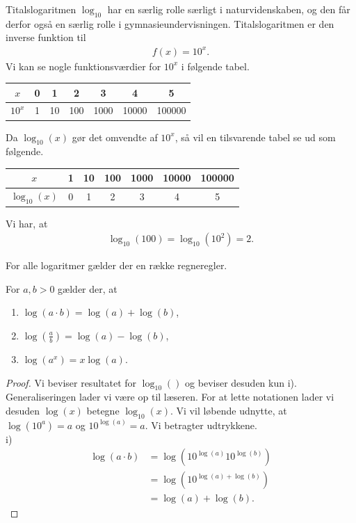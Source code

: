 Titalslogaritmen $\log_{10}$ har en særlig rolle særligt i naturvidenskaben, og den får derfor også en særlig rolle i gymnasieundervisningen. Titalslogaritmen er den inverse funktion til 
\begin{align*}
	f(x) = 10^x.
\end{align*}
Vi kan se nogle funktionsværdier for $10^x$ i følgende tabel.
\begin{table}[H]
	\centering
	\begin{tabular}{c|c|c|c|c|c|c}
		$x$ & 0 & 1 & 2 & 3 & 4 & 5\\
		\hline
		$10^x$ & 1 & 10 & 100 & 1000 & 10000 & 100000
	\end{tabular}
\end{table}
Da $\log_{10}(x)$ gør det omvendte af $10^x$, så vil en tilsvarende tabel se ud som følgende.
\begin{table}[H]
	\centering
	\begin{tabular}{c|c|c|c|c|c|c}
		$x$ & 1 & 10 & 100 & 1000 & 10000 & 100000 \\
		\hline
		$\log_{10}(x)$ & 0 & 1 & 2 & 3 & 4 & 5
	\end{tabular}
\end{table}

\begin{exa}
	Vi har, at 
	\begin{align*}
		\log_{10}(100) = \log_{10}(10^2) = 2.
	\end{align*}
\end{exa}

For alle logaritmer gælder der en række regneregler. 
\begin{setn}[Logaritmeregneregler]
	For $a,b>0$ gælder der, at
	\begin{enumerate}[label=\roman*)]
		\item $\log(a\cdot b) = \log(a)+ \log(b)$,
		\item $\log\left(\frac{a}{b}\right) = \log(a)-\log(b)$,
		\item $\log(a^x) = x\log(a).$
	\end{enumerate}		
\end{setn}
\begin{proof}
	Vi beviser resultatet for $\log_{10}()$ og beviser desuden kun i). Generaliseringen lader vi være op til læseren. For at lette notationen lader vi desuden $\log(x)$ betegne $\log_{10}(x)$.
	Vi vil løbende udnytte, at $\log(10^a) = a$ og $10^{\log(a)} = a$. Vi betragter udtrykkene.
	\\
	i)
	\begin{align*}
		\log(a\cdot b) &= \log(10^{\log(a)}10^{\log(b)}) \\
		&= \log(10^{\log(a)+\log(b)})\\
		&=\log(a) + \log(b).
	\end{align*}
\end{proof}

